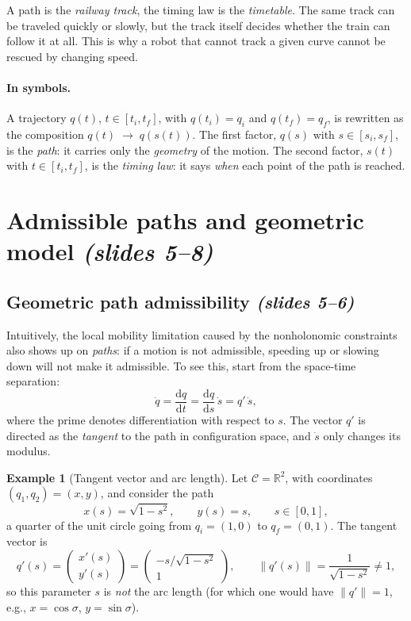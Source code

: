 \documentclass[11pt,a4paper]{article}
\def\boldsymbol#1{#1}%
\newcommand{\dd}{\mathrm{d}}
\newcommand{\q}{\boldsymbol{q}}
\newcommand{\qi}{\boldsymbol{q}_i}
\newcommand{\qf}{\boldsymbol{q}_f}
\theoremstyle{definition}
\newtheorem{example}[definition]{Example}
\theoremstyle{plain}
\theoremstyle{remark}
\begin{document}
\begin{intuition}
A path is the \emph{railway track}, the timing law is the \emph{timetable}. The same track can be traveled quickly or
slowly, but the track itself decides whether the train can follow it at all. This is why a robot that cannot track a given
curve cannot be rescued by changing speed.
\end{intuition}

\paragraph{In symbols.} A trajectory $\q(t)$, $t\in[t_i,t_f]$, with $\q(t_i)=\qi$ and $\q(t_f)=\qf$, is rewritten as the
composition $\q(t)\;\to\;\q(s(t))$. The first factor, $\q(s)$ with $s\in[s_i,s_f]$, is the \emph{path}: it carries only the
\emph{geometry} of the motion. The second factor, $s(t)$ with $t\in[t_i,t_f]$, is the \emph{timing law}: it says \emph{when} each
point of the path is reached.

\section{Admissible paths and geometric model \emph{(slides 5--8)}}

\subsection{Geometric path admissibility \emph{(slides 5--6)}}

Intuitively, the local mobility limitation caused by the nonholonomic constraints also shows up on \emph{paths}: if a
motion is not admissible, speeding up or slowing down will not make it admissible. To see this, start from the
space-time separation:
\begin{equation}
\dot{\q}=\frac{\dd\q}{\dd t}=\frac{\dd\q}{\dd s}\,\dot s=\q'\,\dot s,
\label{eq:sep}
\end{equation}
where the prime denotes differentiation with respect to $s$. The vector $\q'$ is directed as the \emph{tangent} to the
path in configuration space, and $\dot s$ only changes its modulus.

\begin{example}[Tangent vector and arc length]\label{ex:arc}
Let $\mathcal C=\mathbb R^2$, with coordinates $(q_1,q_2)=(x,y)$, and consider the path
\[
x(s)=\sqrt{1-s^2},\qquad y(s)=s,\qquad s\in[0,1],
\]
a quarter of the unit circle going from $\qi=(1,0)$ to $\qf=(0,1)$. The tangent vector is
\[
\q'(s)=\begin{pmatrix}x'(s)\\ y'(s)\end{pmatrix}=\begin{pmatrix}-s/\sqrt{1-s^2}\\ 1\end{pmatrix},\qquad
\|\q'(s)\|=\frac{1}{\sqrt{1-s^2}}\ne 1 ,
\]
so this parameter $s$ is \emph{not} the arc length (for which one would have $\|\q'\|=1$, e.g., $x=\cos\sigma$, $y=\sin\sigma$).
\end{example}
\end{document}

